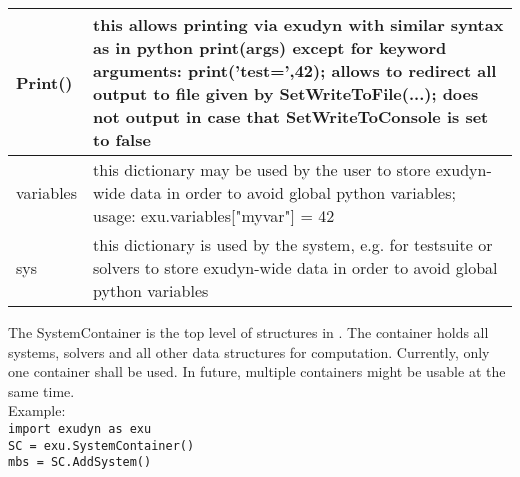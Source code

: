 \begin{center}
\begin{longtable}{| p{8cm} | p{8cm} |}
  Print() & this allows printing via exudyn with similar syntax as in python print(args) except for keyword arguments: print('test=',42); allows to redirect all output to file given by SetWriteToFile(...); does not output in case that SetWriteToConsole is set to false\\ \hline 
  variables & this dictionary may be used by the user to store exudyn-wide data in order to avoid global python variables; usage: exu.variables["myvar"] = 42 \\ \hline  
  sys & this dictionary is used by the system, e.g. for testsuite or solvers to store exudyn-wide data in order to avoid global python variables \\ \hline  
\end{longtable}
\end{center}

The SystemContainer is the top level of structures in \codeName. The container holds all systems, solvers and all other data structures for computation. Currently, only one container shall be used. In future, multiple containers might be usable at the same time. \\ Example: \\ \texttt{import exudyn as exu \\ SC = exu.SystemContainer() \\ mbs = SC.AddSystem()}

